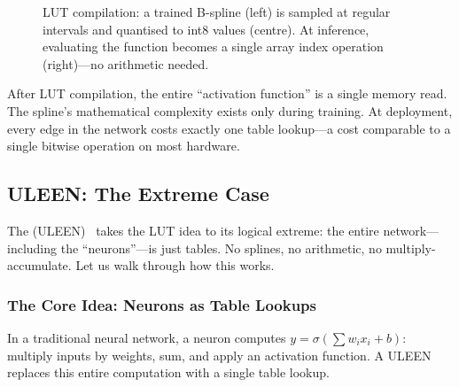 \begin{figure}[htbp]
\caption{LUT compilation: a trained B-spline (left) is sampled at
  regular intervals and quantised to int8 values (centre). At
  inference, evaluating the function becomes a single array index
  operation (right)---no arithmetic needed.}
\label{fig:lut-compilation}
\end{figure}

\begin{keyinsight}
After LUT compilation, the entire ``activation function'' is a single
memory read. The spline's mathematical complexity exists only during
training. At deployment, every edge in the network costs exactly one
table lookup---a cost comparable to a single bitwise operation on
most hardware.
\end{keyinsight}

\subsection{ULEEN: The Extreme Case}
\label{sec:uleen}

The 
(ULEEN)~\cite{uleen2023} takes the LUT idea to its logical extreme:
the entire network---including the ``neurons''---is just tables.
No splines, no arithmetic, no multiply-accumulate. Let us walk through
how this works.

\subsubsection{The Core Idea: Neurons as Table Lookups}

In a traditional neural network, a neuron computes
$y = \sigma(\sum w_i x_i + b)$: multiply inputs by weights, sum,
and apply an activation function. A ULEEN replaces this entire
computation with a single table lookup.


